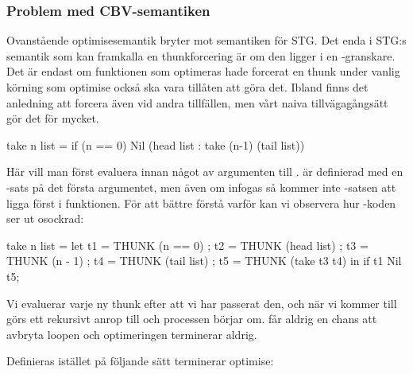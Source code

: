 \documentclass[../Optimise]{subfiles}
\begin{document}

\subsubsection{Problem med CBV-semantiken}
\label{CBV:Problem}

Ovanstående optimisesemantik bryter mot semantiken för STG. 
Det enda i STG:s semantik som kan framkalla en thunkforcering är om den ligger i en -granskare. 
Det är endast om funktionen som optimeras hade forcerat en thunk under vanlig 
körning som optimise också ska vara tillåten att göra det. Ibland finns det anledning 
att forcera även vid andra tillfällen, men vårt naiva tillvägagångsätt gör det
för mycket.

\begin{codeEx}
take n list = if (n == 0) Nil (head list : take (n-1) (tail list))
\end{codeEx}
Här vill man först evaluera  innan något av argumenten till .
 är definierad med en -sats på det första argumentet, men även om
 infogas så kommer inte -satsen att ligga först i funktionen. För att bättre 
förstå varför kan vi observera hur -koden ser ut osockrad:

\begin{codeEx}
take n list = let 
    { t1 = THUNK (n == 0)
    ; t2 = THUNK (head list)
    ; t3 = THUNK (n - 1)
    ; t4 = THUNK (tail list)
    ; t5 = THUNK (take t3 t4)
    } in  if t1 Nil t5;
\end{codeEx}

Vi evaluerar varje ny thunk efter att vi har passerat den, och när vi kommer till 
 görs ett rekursivt anrop till  och processen börjar om.
 får aldrig en chans att avbryta loopen och optimeringen terminerar aldrig.

Definieras  istället på följande sätt terminerar optimise:
\end{document}
